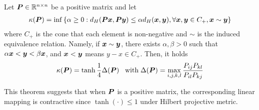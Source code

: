 \begin{theorem}
Let ${\bm{P}}\in\mathbb{R}^{n\times n}$ be a positive matrix and let
\begin{align*}
    \kappa({\bm{P}}) = \inf\left\{\alpha\geq 0: d_H({\bm{P}}{\bm{x}},{\bm{P}}{\bm{y}})\leq \alpha d_H({\bm{x}},{\bm{y}}), \forall {\bm{x}},{\bm{y}} \in C_+, {\bm{x}} \sim {\bm{y}} \right\}
\end{align*}
where $C_+$ is the cone that each element is non-negative and $\sim$ is the induced equivalence relation. Namely, if ${\bm{x}}\sim{\bm{y}}$, there exists $\alpha,\beta>0$ such that $\alpha{\bm{x}}<{\bm{y}}<\beta{\bm{x}}$, and ${\bm{x}}<{\bm{y}}$ means $y-x\in C_+$. Then, it holds
\begin{align*}
    \kappa({\bm{P}}) = \tanh{\frac{1}{4}\Delta({\bm{P}})}\;\;\;\text{with}\;\Delta({\bm{P}}) = \max_{i,j,k,l}\frac{P_{ij}P_{kl}}{P_{il}P_{kj}}
\end{align*}
\label{thm: Birkhoff-Hopf}
\end{theorem}
This theorem suggests that when ${\bm{P}}$ is a positive matrix, the corresponding linear mapping is contractive since $\tanh(\cdot)\leq 1$ under Hilbert projective metric. 

